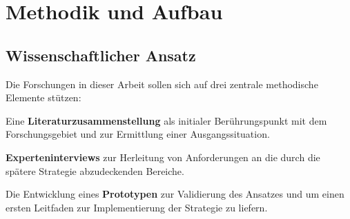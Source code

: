 \section{Methodik und Aufbau}
\label{sec:01-05_methodology-and-structure}

\subsection{Wissenschaftlicher Ansatz}
\label{subsec:01-05-01_scientific-approach}

Die Forschungen in dieser Arbeit sollen sich auf drei zentrale methodische Elemente stützen:

\begin{itemize}
    \begin{minipage}[t]{0.75\textwidth}
        \item Eine \textbf{Literaturzusammenstellung} als initialer Berührungspunkt mit dem Forschungsgebiet und zur Ermittlung einer Ausgangssituation.
        \item \textbf{Experteninterviews} zur Herleitung von Anforderungen an die durch die spätere Strategie abzudeckenden Bereiche.
        \item Die Entwicklung eines \textbf{Prototypen} zur Validierung des Ansatzes und um einen ersten Leitfaden zur Implementierung der Strategie zu liefern.
    \end{minipage}
\end{itemize}

\begin{comment}
    (A) Einführung -> 01, 02
    (B) DevOps und GitOps -> 03; RQ-1
    (C) Dev Container und Developer Experience -> 03; RQ-2
    (D) Anforderungen an Development und Deployment Umgebungen -> 04; RQ-0
    (E) Experten-Interview -> 04
    (F) Sicherheit, Wartbarkeit und Performanz von Docker Images -> 05; RQ-3

    (0) Paper -> 30 Stk.
    (1) Artikel -> 12 Stk.
    (2) Journale oder Blogs -> 14 Stk.
    (3) Dokumentationen -> 11 Stk.
    (4) Bücher -> 02 Stk.

    - Durchlauf eines Peer-Reviews
    - Veröffentlichung in einem renommierten Journal oder einer renommierten Konferenz
    - Aktualität
    - Methodik
    - Transparenz der Daten und Quellen
    - Anzahl an Zitationen in anderer Literatur
\end{comment}

